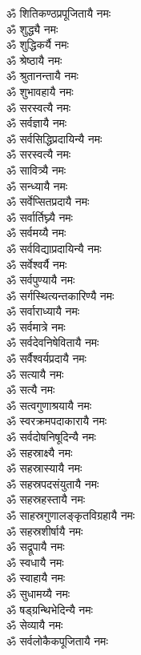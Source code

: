 \begin{flushleft}
\begin{multicols}{2}
ॐ शितिकण्ठप्रपूजितायै नमः\\
ॐ शुद्ध्यै नमः\\
ॐ शुद्धिकर्यै नमः\hfill{}\\
ॐ श्रेष्ठायै नमः\\
ॐ श्रुतानन्तायै नमः\\
ॐ शुभावहायै नमः\\
ॐ सरस्वत्यै नमः\\
ॐ सर्वज्ञायै नमः\\
ॐ सर्वसिद्धिप्रदायिन्यै नमः\\
ॐ सरस्वत्यै नमः\\
ॐ सावित्र्यै नमः\\
ॐ सन्ध्यायै नमः\\
ॐ सर्वेप्सितप्रदायै नमः\hfill{}\\
ॐ सर्वार्तिघ्न्यै नमः\\
ॐ सर्वमय्यै नमः\\
ॐ सर्वविद्याप्रदायिन्यै नमः\\
ॐ सर्वेश्वर्यै नमः\\
ॐ सर्वपुण्यायै नमः\\
ॐ सर्गस्थित्यन्तकारिण्यै नमः\\
ॐ सर्वाराध्यायै नमः\\
ॐ सर्वमात्रे नमः\\
ॐ सर्वदेवनिषेवितायै नमः\\
ॐ सर्वैश्वर्यप्रदायै नमः\hfill{}\\
ॐ सत्यायै नमः\\
ॐ सत्यै नमः\\
ॐ सत्वगुणाश्रयायै नमः\\
ॐ स्वरक्रमपदाकारायै नमः\\
ॐ सर्वदोषनिषूदिन्यै नमः\\
ॐ सहस्राक्ष्यै नमः\\
ॐ सहस्रास्यायै नमः\\
ॐ सहस्रपदसंयुतायै नमः\\
ॐ सहस्रहस्तायै नमः\\
ॐ साहस्रगुणालङ्कृतविग्रहायै नमः\hfill{}\\
ॐ सहस्रशीर्षायै नमः\\
ॐ सद्रूपायै नमः\\
ॐ स्वधायै नमः\\
ॐ स्वाहायै नमः\\
ॐ सुधामय्यै नमः\\
ॐ षड्ग्रन्थिभेदिन्यै नमः\\
ॐ सेव्यायै नमः\\
ॐ सर्वलोकैकपूजितायै नमः\\

\end{multicols}
\end{flushleft}
